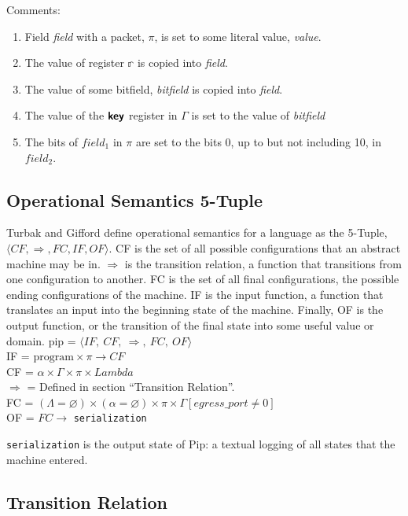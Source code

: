 Comments:
\begin{enumerate}
\item Field \textit{field} with a packet, $\pi$, is set to some literal value, \textit{value}.
\item The value of register $\mathbb{r}$ is copied into \textit{field}.
\item The value of some bitfield, \textit{bitfield} is copied into \textit{field}.
\item The value of the $\bm{\mathsf{{key}}}$ register in $\Gamma$ is set to the value of \textit{bitfield}
\item The bits of $field_1$ in $\pi$ are set to the bits 0, up to but not including 10, in $field_2$.
\end{enumerate}


\subsection{Operational Semantics 5-Tuple}
Turbak and Gifford define operational semantics for a language as the 5-Tuple, $\langle CF, \Rightarrow, FC, IF, OF \rangle$. CF is the set of all possible configurations that an abstract machine may be in. $\Rightarrow$ is the transition relation, a function that transitions from one configuration to another. FC is the set of all final configurations, the possible ending configurations of the machine. IF is the input function, a function that translates an input into the beginning state of the machine. Finally, OF is the output function, or the transition of the final state into some useful value or domain.
pip = $\langle IF, \ CF, \ \Rightarrow, \ FC, \ OF \rangle$\\
IF = $\textrm{program} \times \pi \rightarrow CF$ \\
CF = $\alpha \times \Gamma \times \pi \times Lambda$ \\
$\Rightarrow$ = Defined in section ``Transition Relation''. \\
FC = $(\Lambda = \varnothing) \times (\alpha = \varnothing) \times \pi \times \Gamma[egress\_port \neq 0]$ \\
OF = $FC \rightarrow$ \texttt{serialization}

\texttt{serialization} is the output state of Pip: a textual logging of all states that the machine entered.
\subsection{Transition Relation}
\setlength{\mathindent}{0pt}

